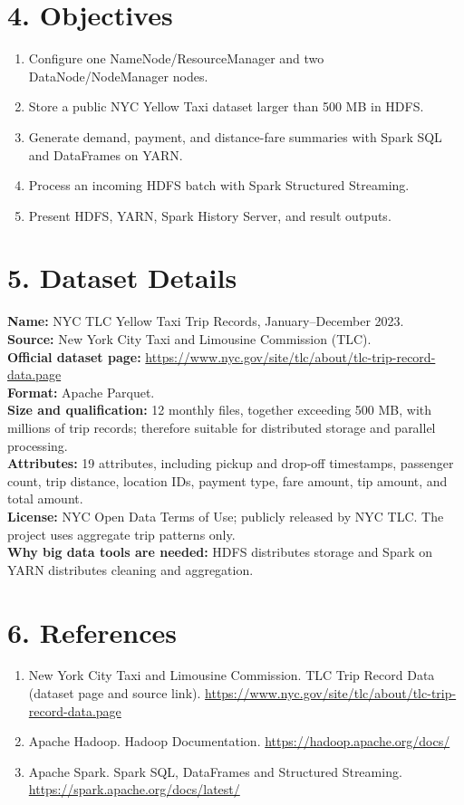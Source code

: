 \documentclass[12pt,a4paper]{article}
\begin{document}
\section*{4. Objectives}
\begin{enumerate}
\item Configure one NameNode/ResourceManager and two DataNode/NodeManager nodes.
\item Store a public NYC Yellow Taxi dataset larger than 500 MB in HDFS.
\item Generate demand, payment, and distance-fare summaries with Spark SQL and DataFrames on YARN.
\item Process an incoming HDFS batch with Spark Structured Streaming.
\item Present HDFS, YARN, Spark History Server, and result outputs.
\end{enumerate}
\section*{5. Dataset Details}
\textbf{Name:} NYC TLC Yellow Taxi Trip Records, January--December 2023.\\
\textbf{Source:} New York City Taxi and Limousine Commission (TLC).\\
\textbf{Official dataset page:} \url{https://www.nyc.gov/site/tlc/about/tlc-trip-record-data.page}\\
\textbf{Format:} Apache Parquet.\\
\textbf{Size and qualification:} 12 monthly files, together exceeding 500 MB, with millions of trip records; therefore suitable for distributed storage and parallel processing.\\
\textbf{Attributes:} 19 attributes, including pickup and drop-off timestamps, passenger count, trip distance, location IDs, payment type, fare amount, tip amount, and total amount.\\
\textbf{License:} NYC Open Data Terms of Use; publicly released by NYC TLC. The project uses aggregate trip patterns only.\\
\textbf{Why big data tools are needed:} HDFS distributes storage and Spark on YARN distributes cleaning and aggregation.
\section*{6. References}
\begin{enumerate}
\item New York City Taxi and Limousine Commission. TLC Trip Record Data (dataset page and source link). \url{https://www.nyc.gov/site/tlc/about/tlc-trip-record-data.page}
\item Apache Hadoop. Hadoop Documentation. \url{https://hadoop.apache.org/docs/}
\item Apache Spark. Spark SQL, DataFrames and Structured Streaming. \url{https://spark.apache.org/docs/latest/}
\end{enumerate}
\end{document}
